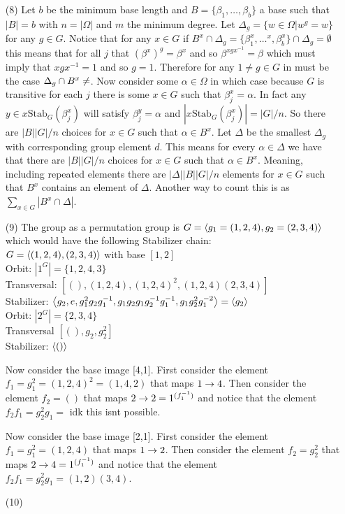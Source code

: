 \documentclass[12pt]{amsart}
\begin{document}
\begin{itemize}
\begin{enumerate}[label= (\alph*)]
   \end{enumerate}
   \item[(8)] Let $b$ be the minimum base length and $B=\{\beta_1,\dots,\beta_b\}$ a base such 
   that $|B|=b$ with $n=|\Omega|$ and $m$ the minimum degree. Let $\Delta_g=\{w\in\Omega| w^g=w\}$ for any 
   $g\in G$. Notice that for any $x\in G$ if $B^x\cap \Delta_g=\{\beta_1^x,\dots^x,\beta_b^x\}\cap\Delta_g=\emptyset$
   this means that for all $j$ that $(\beta^x)^g=\beta^x$ and so $\beta^{xgx^{-1}}=\beta$ which must
   imply that $xgx^{-1}=1$ and so $g=1$. Therefore for any $1\neq g\in G$ in must be the case 
   $\Delta_g\cap B^x\neq \empty$. Now consider some $\alpha\in \Omega$ in which case because $G$
   is transitive for each $j$ there is some $x\in G$ such that $\beta_j^x=\alpha$. In fact any 
   $y\in x\text{Stab}_G(\beta_j^x)$ will satisfy $\beta_j^y=\alpha$ and $|x\text{Stab}_G(\beta_j^x)|=|G|/n$.
   So there are $|B||G|/n$ choices for $x\in G$ such that $\alpha\in B^x$. Let $\Delta$ be the smallest 
   $\Delta_g$ with corresponding group element $d$. This means for every $\alpha\in \Delta$ we have that
   there are $|B||G|/n$ choices for $x\in G$ such that $\alpha\in B^x$. Meaning, including repeated elements 
   there are $|\Delta||B||G|/n$ elements for $x\in G$ such that $B^x$ contains an element of $\Delta$. 
   Another way to count this is as $\sum_{x\in G}|B^x\cap \Delta|$.
   
   
   \item[(9)] The group as a permutation group is $G=\left\langle g_1=(1,2,4),g_2=(2,3,4) \right\rangle$ 
   which would have the following Stabilizer chain:\\
   $G=\left\langle (1,2,4),(2,3,4) \right\rangle$ with base $[1,2]$\\
   Orbit: $|1^G|=\{1,2,4,3\}$\\
   Transversal: $[(),(1,2,4), (1,2,4)^2, (1,2,4)(2,3,4)]$\\
   Stabilizer: $\left\langle g_2,e,g_1^2g_2g_1^{-1},g_1g_2g_1g_2^{-1}g_1^{-1},g_1g_2^2g_1^{-2} \right\rangle=\left\langle g_2 \right\rangle$\\
      \hspace*{.5in}Orbit: $|2^{G}|=\{2,3,4\}$\\
      \hspace*{.5in}Transversal $[(),g_2,g_2^2]$\\
      \hspace*{.5in}Stabilizer: $\left\langle () \right\rangle$  

      Now consider the base image [4,1]. First consider the element $f_1=g^2_1=(1,2,4)^2=(1,4,2)$ 
      that maps $1\rightarrow 4$.
      Then consider the element $f_2=()$ that maps $2\rightarrow 2=1^{(f_1^{-1})}$ and notice that the element
      $f_2f_1=g_2^2g_1=$ idk this isnt possible.

      Now consider the base image [2,1]. First consider the element $f_1=g^2_1=(1,2,4)$ 
      that maps $1\rightarrow 2$.
      Then consider the element $f_2=g_2^2$ that maps $2\rightarrow 4=1^{(f_1^{-1})}$ and notice that the element
      $f_2f_1=g_2^2g_1=(1,2)(3,4)$.


   \item[(10)]
\end{itemize}
\end{document}
